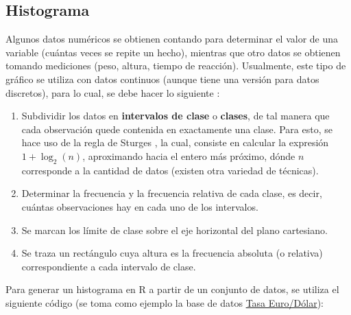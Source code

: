 \documentclass[
  11pt,
]{book}
\providecommand{\tightlist}{%
  \setlength{\itemsep}{0pt}\setlength{\parskip}{0pt}}
\theoremstyle{definition}
\theoremstyle{definition}
\theoremstyle{definition}
\theoremstyle{definition}
\theoremstyle{remark}
\begin{document}
\subsection{Histograma}\label{topicos-graficos-histograma}

Algunos datos numéricos se obtienen contando para determinar el valor de una variable (cuántas veces se repite un hecho), mientras que otro datos se obtienen tomando mediciones (peso, altura, tiempo de reacción). Usualmente, este tipo de gráfico se utiliza con datos continuos (aunque tiene una versión para datos discretos), para lo cual, se debe hacer lo siguiente \citep[página 12]{Devore}:

\begin{enumerate}
\def\labelenumi{\arabic{enumi}.}
\tightlist
\item
  Subdividir los datos en \textbf{intervalos de clase} o \textbf{clases}, de tal manera que cada observación quede contenida en exactamente una clase. Para esto, se hace uso de la regla de Sturges \citeyearpar{sturges1926choice}, la cual, consiste en calcular la expresión \(1+\log_2(n)\), aproximando hacia el entero más próximo, dónde \(n\) corresponde a la cantidad de datos (existen otra variedad de técnicas).
\item
  Determinar la frecuencia y la frecuencia relativa de cada clase, es decir, cuántas observaciones hay en cada uno de los intervalos.
\item
  Se marcan los límite de clase sobre el eje horizontal del plano cartesiano.
\item
  Se traza un rectángulo cuya altura es la frecuencia absoluta (o relativa) correspondiente a cada intervalo de clase.
\end{enumerate}

Para generar un histograma en R a partir de un conjunto de datos, se utiliza el siguiente código (se toma como ejemplo la base de datos \hyperref[TasaEURUSD]{Tasa Euro/Dólar}):
\end{document}

